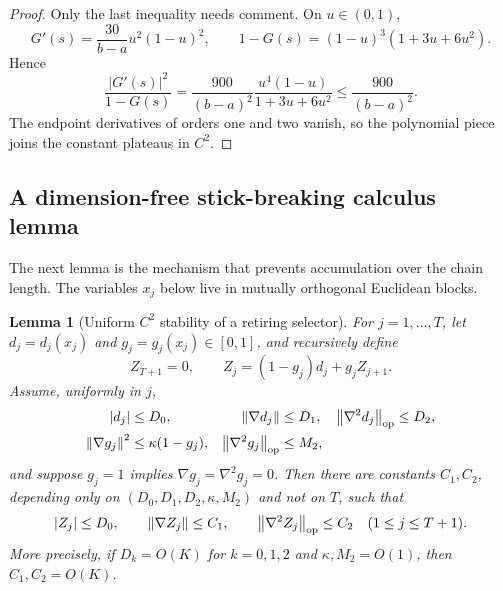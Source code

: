 \documentclass[11pt,a4paper]{article}
\newcommand{\norm}[1]{\left\lVert #1\right\rVert}
\newtheorem{lemma}[theorem]{Lemma}
\theoremstyle{remark}
\begin{document}
\begin{proof}
Only the last inequality needs comment.  On $u\in(0,1)$,
\[
 G'(s)=\frac{30}{b-a}u^2(1-u)^2,
 \qquad
 1-G(s)=(1-u)^3(1+3u+6u^2).
\]
Hence
\[
 \frac{|G'(s)|^2}{1-G(s)}
 =\frac{900}{(b-a)^2}
   \frac{u^4(1-u)}{1+3u+6u^2}
 \le \frac{900}{(b-a)^2}.
\]
The endpoint derivatives of orders one and two vanish, so the polynomial
piece joins the constant plateaus in $C^2$.
\end{proof}

\subsection{A dimension-free stick-breaking calculus lemma}

The next lemma is the mechanism that prevents accumulation over the chain
length.  The variables $x_j$ below live in mutually orthogonal Euclidean
blocks.

\begin{lemma}[Uniform $C^2$ stability of a retiring selector]
\label{lem:stick-breaking}
For $j=1,\ldots,T$, let $d_j=d_j(x_j)$ and
$g_j=g_j(x_j)\in[0,1]$, and recursively define
\begin{equation}
 Z_{T+1}=0,
 \qquad
 Z_j=(1-g_j)d_j+g_jZ_{j+1}.
 \label{eq:stick-recursion}
\end{equation}
Assume, uniformly in $j$,
\begin{align}
 |d_j|&\le D_0,&
 \norm{\nabla d_j}&\le D_1,&
 \norm{\nabla^2d_j}_{\rm op}&\le D_2,
 \label{eq:stick-d-bounds}\\
 \norm{\nabla g_j}^2&\le\kappa(1-g_j),&
 \norm{\nabla^2g_j}_{\rm op}&\le M_2,
 \label{eq:stick-g-bounds}
\end{align}
and suppose $g_j=1$ implies
$\nabla g_j=\nabla^2g_j=0$.  Then there are constants
$C_1,C_2$, depending only on
$(D_0,D_1,D_2,\kappa,M_2)$ and not on $T$, such that
\begin{equation}
 |Z_j|\le D_0,
 \qquad
 \norm{\nabla Z_j}\le C_1,
 \qquad
 \norm{\nabla^2Z_j}_{\rm op}\le C_2
 \quad(1\le j\le T+1).
 \label{eq:stick-uniform}
\end{equation}
More precisely, if $D_k=O(K)$ for $k=0,1,2$ and
$\kappa,M_2=O(1)$, then $C_1,C_2=O(K)$.
\end{lemma}
\end{document}
